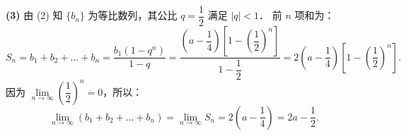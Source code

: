\begin{answer}
\textbf{(3)}
由 (2) 知 $\{b_n\}$ 为等比数列，其公比 $q = \dfrac{1}{2}$ 满足 $|q| < 1$．
前 $n$ 项和为：
\nopagebreak[4]
\[
S_n = b_1 + b_2 + \dots + b_n = \frac{b_1 (1 - q^n)}{1 - q} = \frac{\left(a - \dfrac{1}{4}\right)\left[1 - \left(\dfrac{1}{2}\right)^n\right]}{1 - \dfrac{1}{2}} = 2\left(a - \frac{1}{4}\right)\left[1 - \left(\frac{1}{2}\right)^n\right].
\]
因为 $\lim\limits_{n \to \infty} \left(\dfrac{1}{2}\right)^n = 0$，所以：
\nopagebreak[4]
\[
\lim_{n \to \infty} (b_1 + b_2 + \dots + b_n) = \lim_{n \to \infty} S_n = 2\left(a - \frac{1}{4}\right) = 2a - \frac{1}{2}.
\]




\end{answer}
